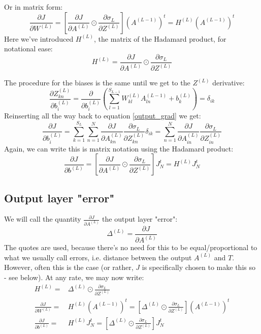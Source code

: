 \documentclass[12pt, a4paper]{article}
\numberwithin{equation}{section}
\begin{document}
Or in matrix form:
\begin{equation}
\label{output_weights_matrix}
\frac{\partial J}{\partial W^{(L)}}=\left[\frac{\partial J}{\partial A^{(L)}}\odot\frac{\partial\sigma_L}{\partial Z^{(L)}}\right]\left(A^{(L-1)}\right)^t=H^{(L)}\left(A^{(L-1)}\right)^t
\end{equation}
Here we've introduced $H^{(L)}$, the matrix of the Hadamard product, for notational ease:
\begin{equation}
H^{(L)}=\frac{\partial J}{\partial A^{(L)}}\odot\frac{\partial\sigma_L}{\partial Z^{(L)}}
\end{equation}

The procedure for the biases is the same until we get to the $Z^{(L)}$ derivative:
\begin{equation}
\frac{\partial Z^{(L)}_{kn}}{\partial b^{(L)}_i}=\frac{\partial}{\partial b^{(L)}_i}\left(\sum_{l=1}^{S_{L-1}}W^{(L)}_{kl}A^{(L-1)}_{ln}+b^{(L)}_k\right)=\delta_{ik}
\end{equation}
Reinserting all the way back to equation \ref{output_grad} we get:
\begin{equation}
\frac{\partial J}{\partial b^{(L)}_i}=\sum_{k=1}^{S_L}\sum_{n=1}^N\frac{\partial J}{\partial A^{(L)}_{kn}}\frac{\partial\sigma_L}{\partial Z^{(L)}_{kn}}\delta_{ik}=\sum_{n=1}^N\frac{\partial J}{\partial A^{(L)}_{in}}\frac{\partial\sigma_L}{\partial Z^{(L)}_{in}}
\end{equation}
Again, we can write this is matrix notation using the Hadamard product:
\begin{equation}
\label{output_bias_matrix}
\frac{\partial J}{\partial b^{(L)}}=\left[\frac{\partial J}{\partial A^{(L)}}\odot\frac{\partial\sigma_L}{\partial Z^{(L)}}\right]J_N^t=H^{(L)}J_N^t
\end{equation}

\subsection{Output layer "error"}
We will call the quantity $\frac{\partial J}{\partial A^{(L)}}$ the output layer "error":
\begin{equation}
\Delta^{(L)}=\frac{\partial J}{\partial A^{(L)}}
\end{equation}
The quotes are used, because there's no need for this to be equal/proportional to what we usually call errors, i.e. distance between the output $A^{(L)}$ and $T$. However, often this is the case (or rather, $J$ is specifically chosen to make this so - see below). At any rate, we may now write:
\begin{align}
\label{output_weights_H}
H^{(L)}=&\Delta^{(L)}\odot\frac{\partial\sigma_L}{\partial Z^{(L)}}\\
\frac{\partial J}{\partial W^{(L)}}=&H^{(L)}\left(A^{(L-1)}\right)^t=\left[\Delta^{(L)}\odot\frac{\partial\sigma_L}{\partial Z^{(L)}}\right]\left(A^{(L-1)}\right)^t\\
\label{output_bias_H}
\frac{\partial J}{\partial b^{(L)}}=&H^{(L)}J_N^t=\left[\Delta^{(L)}\odot\frac{\partial\sigma_L}{\partial Z^{(L)}}\right]J_N^t
\end{align}
\end{document}
